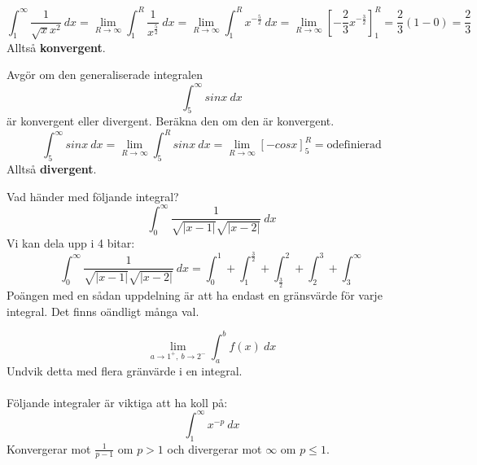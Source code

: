 \documentclass{report}
\begin{document}
\sol
\begin{equation*}
	\int_{1}^{ \infty} \frac{1}{ \sqrt{x} x^2}  \: dx = \lim_{R \to \infty} \int_{1}^{R} \frac{1}{x^{ \frac{5}{2}  } }  \: dx = \lim_{R \to \infty} \int_{1}^{R} x^{ - \frac{5}{2} } \: dx = \lim_{R \to \infty} [- \frac{2}{3}  x^{- \frac{3}{2} }]_{1}^{R} = \frac{2}{3} (1 - 0) = \frac{2}{3}   
\end{equation*}
Alltså \textbf{konvergent}.

\vspace{20pt}
\qs{}
{
Avgör om den generaliserade integralen
\begin{equation*}
\int_{5}^{ \infty} sinx \: dx 
\end{equation*}
är konvergent eller divergent. Beräkna den om den är konvergent.
}
\sol 
\begin{equation*}
	\int_{5}^{ \infty} sinx \: dx = \lim_{R \to \infty} \int_{5}^{R} sinx \: dx = \lim_{R \to \infty} [-cosx]_{5}^{R} = \text{odefinierad}   
\end{equation*}
Alltså \textbf{divergent}.

\vspace{80pt}
\noindent
Vad händer med följande integral?
\begin{equation*}
\int_{0}^{ \infty} \frac{1}{ \sqrt{|x-1|} \sqrt{|x-2|} }  \: dx 
\end{equation*}
\noindent
Vi kan dela upp i 4 bitar:
\begin{equation*}
	\int_{0}^{ \infty} \frac{1}{ \sqrt{|x-1|} \sqrt{|x-2|} }  \: dx = \int_{0}^{1} +  \int_{1}^{ \frac{3}{2} } + \int_{ \frac{3}{2} }^{2} + \int_{2}^{3} + \int_{3}^{ \infty}     
\end{equation*}
Poängen med en sådan uppdelning är att ha endast en gränsvärde för varje integral. Det finns oändligt många val. 

{
\begin{equation*}
	\lim_{a \to 1^+,\: b \to 2^-} \int_{a}^{b} f(x) \: dx 
\end{equation*}
}
\noindent
Undvik detta med flera gränvärde i en integral.\\\\

\noindent
Följande integraler är viktiga att ha koll på:
\begin{equation*}
	\int_{1}^{ \infty} x^{-p} \: dx  
\end{equation*}
Konvergerar mot $ \frac{1}{p-1}  $ om $ p > 1 $ och divergerar mot $ \infty $ om $ p \le 1 $.\\\\
\end{document}

